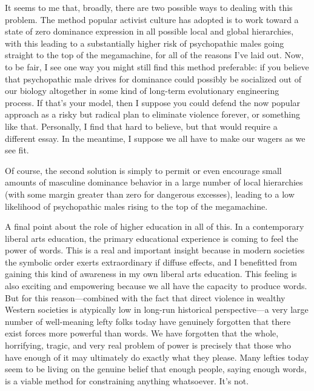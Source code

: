 \documentclass[a4paper,12pt,margin=.5in]{article}
\begin{document}
It seems to me that, broadly, there are two possible ways to dealing
with this problem. The method popular activist culture has adopted is to
work toward a state of zero dominance expression in all possible local
and global hierarchies, with this leading to a substantially higher risk
of psychopathic males going straight to the top of the megamachine, for
all of the reasons I've laid out. Now, to be fair, I see one way you
might still find this method preferable: if you believe that
psychopathic male drives for dominance could possibly be socialized out
of our biology altogether in some kind of long-term evolutionary
engineering process. If that's your model, then I suppose you could
defend the now popular approach as a risky but radical plan to eliminate
violence forever, or something like that. Personally, I find that hard
to believe, but that would require a different essay. In the meantime, I
suppose we all have to make our wagers as we see fit.

Of course, the second solution is simply to permit or even encourage
small amounts of masculine dominance behavior in a large number of local
hierarchies (with some margin greater than zero for dangerous excesses),
leading to a low likelihood of psychopathic males rising to the top of
the megamachine.

A final point about the role of higher education in all of this. In a
contemporary liberal arts education, the primary educational experience
is coming to feel the power of words. This is a real and important
insight because in modern societies the symbolic order exerts
extraordinary if diffuse effects, and I benefitted from gaining this
kind of awareness in my own liberal arts education. This feeling is also
exciting and empowering because we all have the capacity to produce
words. But for this reason---combined with the fact that direct violence
in wealthy Western societies is atypically low in long-run historical
perspective---a very large number of well-meaning lefty folks today have
genuinely forgotten that there exist forces more powerful than words. We
have forgotten that the whole, horrifying, tragic, and very real problem
of power is precisely that those who have enough of it may ultimately do
exactly what they please. Many lefties today seem to be living on the
genuine belief that enough people, saying enough words, is a viable
method for constraining anything whatsoever. It's not.
\end{document}
